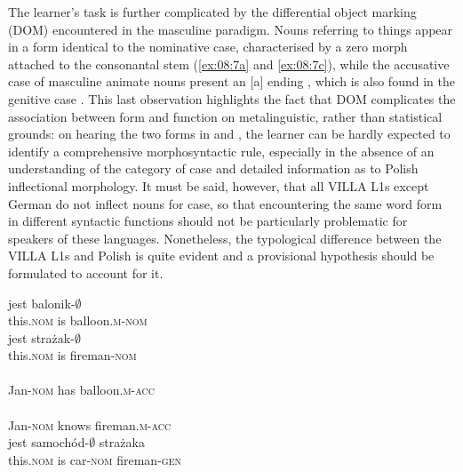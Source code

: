 The learner’s task is further complicated by the differential object marking (DOM) encountered in the masculine paradigm. Nouns referring to things appear in a form identical to the nominative case, characterised by a zero morph attached to the consonantal stem (\ref{ex:08:7a} and \ref{ex:08:7c}), while the accusative case of masculine animate nouns  present an [a] ending , which is also found in the genitive case . This last observation highlights the fact that DOM complicates the association between form and function on metalinguistic, rather than statistical grounds: on hearing the two forms in  and , the learner can be hardly expected to identify a comprehensive morphosyntactic rule, especially in the absence of an understanding of the category of case and detailed information as to Polish inflectional morphology. It must be said, however, that all VILLA L1s except German do not inflect nouns for case, so that encountering the same word form in different syntactic functions should not be particularly problematic for speakers of these languages. Nonetheless, the typological difference between the VILLA L1s and Polish is quite evident and a provisional hypothesis should be formulated to account for it. 

\ea%
    \label{ex:08:7}
    \ea\label{ex:08:7a}
        {jest}  {balonik{}-${\emptyset}$}\\
            this\textsc{.nom}  is  balloon\textsc{.m-nom}\\
    \ex\label{ex:08:7b}
        {jest}  {strażak-${\emptyset}$}\\
            this\textsc{.nom}  is  fireman\textsc{-nom}\\
    \ex\label{ex:08:7c}
    \\
            Jan\textsc{-nom}  has  balloon\textsc{.m-acc}\\
    \ex\label{ex:08:7d}
    \\
            Jan\textsc{-nom}  knows  fireman\textsc{.m-acc}\\
    \ex\label{ex:08:7e}
        {jest}  {samochód-${\emptyset}$}  {strażaka}\\
            this\textsc{.nom}  is  car\textsc{-nom}  fireman\textsc{-gen}\\
    \z
\z

